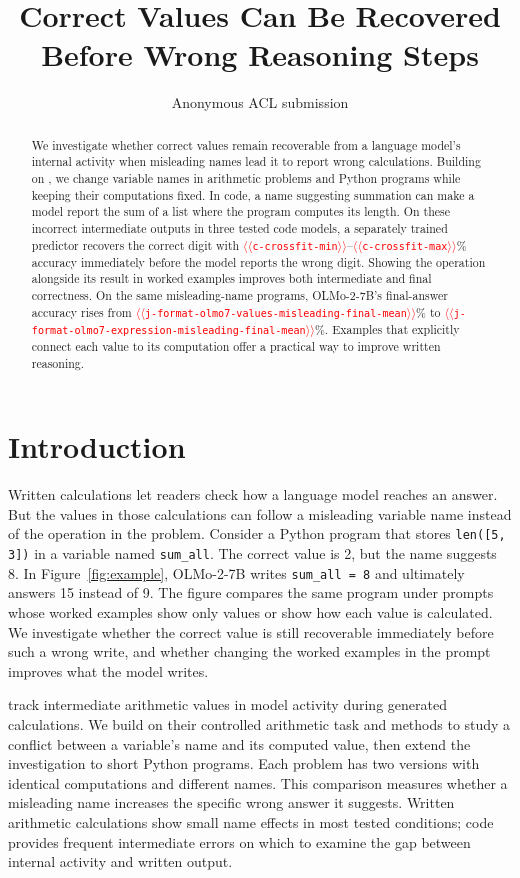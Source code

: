\documentclass[11pt]{article}
\title{Correct Values Can Be Recovered Before Wrong Reasoning Steps}
\author{Anonymous ACL submission}
\providecommand{\NUM}[1]{\textcolor{red}{$\langle\langle$\texttt{#1}$\rangle\rangle$}}
\begin{document}
\maketitle

\begin{abstract}
We investigate whether correct values remain recoverable from a language
model's internal activity when misleading names lead it to report wrong
calculations. Building on \citet{kudo2026faithful}, we change variable names in
arithmetic problems and Python programs while keeping their computations fixed.
In code, a name suggesting summation can make a model report the sum of a list
where the program computes its length. On these incorrect intermediate outputs
in three tested code models, a separately trained predictor recovers the correct
digit with \NUM{c-crossfit-min}--\NUM{c-crossfit-max}\% accuracy immediately before
the model reports the wrong digit. Showing the operation alongside its result
in worked examples improves both intermediate and final correctness. On the same
misleading-name programs, OLMo-2-7B's final-answer accuracy rises from
\NUM{j-format-olmo7-values-misleading-final-mean}\% to
\NUM{j-format-olmo7-expression-misleading-final-mean}\%.
Examples that explicitly connect each value to its computation offer a practical
way to improve written reasoning.
\end{abstract}

\section{Introduction}

Written calculations let readers check how a language model reaches an answer.
But the values in those calculations can follow a misleading variable name
instead of the operation in the problem. Consider a Python program that stores
\texttt{len([5, 3])} in a variable named \texttt{sum\_all}. The correct value is 2,
but the name suggests 8. In Figure~\ref{fig:example}, OLMo-2-7B writes
\texttt{sum\_all = 8} and ultimately answers 15 instead of 9.
The figure compares the same program under prompts whose worked examples
show only values or show how each value is calculated.
We investigate whether the correct value is still recoverable immediately
before such a wrong write, and whether changing the worked examples in the prompt improves
what the model writes.

\citet{kudo2026faithful} track intermediate arithmetic values in model activity
during generated calculations. We build on their controlled arithmetic task
and methods to study a conflict between a variable's name and its computed value,
then extend the investigation to short Python programs. Each problem has two
versions with identical computations and different names. This comparison
measures whether a misleading name increases the specific wrong answer it
suggests. Written arithmetic calculations show small name effects in most tested
conditions; code provides frequent intermediate errors on which to examine the
gap between internal activity and written output.
\end{document}

